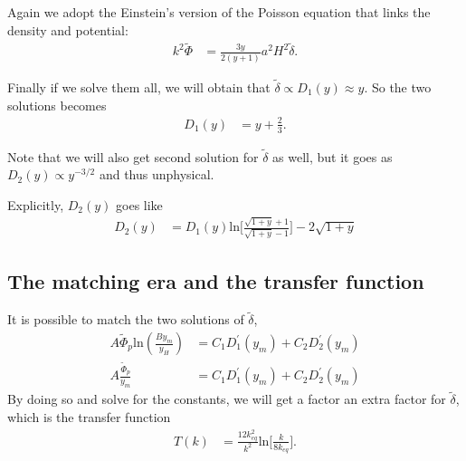 \documentclass[a4paper, 12pt]{article}
\begin{document}
{{            Again we adopt the
            Einstein's version of the Poisson equation that links
            the density and potential: 
            \begin{align}
              \label{einsten version of poisson for density and
              potential}
              k^2 \tilde{\Phi} &=  \frac{3y}{2(y+1)} a^2 H^2
              \tilde{\delta}. 
            \end{align}

            

            Finally if we solve them all, we will obtain that \(
             \tilde{\delta} \propto D_1(y) \approx y \).
             So the two solutions becomes 
             \begin{align}
              \label{D_1 of matter}
               D_1(y) &=  y + \frac{2}{3}. 
             \end{align} 

             Note that we will also get second
             solution for \( \tilde{\delta} \) as well, but it
             goes as \( D_2(y) \propto y^{-3/2}  \) and thus
             unphysical.

             Explicitly, \( D_2(y) \) goes like 
             \begin{align}
               \label{D_2(y) of matter}
               D_2(y) &= D_1(y) \mathrm{ln} \bigg[
               \frac{\sqrt{1+y} + 1}{ \sqrt{1+y} - 1 }  \bigg] -
               2 \sqrt{1+y} 
             \end{align}

            \subsection{The matching era and the transfer
            function}%
              \label{sub:The matching era and the transfer
                        function}
              It is possible to match the two solutions of \(
              \tilde{\delta}   \),
              \begin{align}
                \label{matching Ds}
                A \tilde{\Phi}_{p} \mathrm{ln} ( \frac{B
                y_{m}}{y_H} ) &= C_1 D_1^{\prime}(y_{m}) + C_2
                D_2^{\prime}(y_{m}) \\ 
                A \frac{\tilde{\Phi}_{p}}{y_m} &= C_1 D_1^{\prime}(y_{m}) + C_2
                D_2^{\prime}(y_{m}) 
              \end{align}
              By doing so and solve for the constants, we will get a
              factor an extra factor for \( \tilde{\delta} \),
              which is the transfer function
              \begin{align}
                \label{transfer function for matter}
                T(k) &=  \frac{12 k_{eq}^{2}}{k^2} \mathrm{ln}
                \bigg[\frac{k}{8 k_{eq}} \bigg].
              \end{align}

}}
\end{document}
